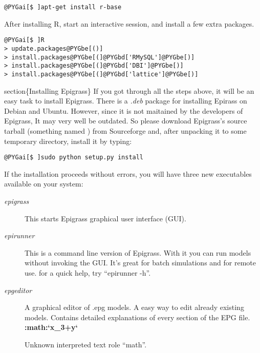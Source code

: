 \documentclass[a4paper,10pt]{manual}
\begin{document}
\begin{Verbatim}[commandchars=@\[\]]
@PYGai[$ ]apt-get install r-base
\end{Verbatim}

After installing R, start an interactive session, and install a few extra packages.

\begin{Verbatim}[commandchars=@\[\]]
@PYGai[$ ]R
> update.packages@PYGbe[()]
> install.packages@PYGbe[(]@PYGbd['RMySQL']@PYGbe[)]
> install.packages@PYGbe[(]@PYGbd['DBI']@PYGbe[)]
> install.packages@PYGbe[(]@PYGbd['lattice']@PYGbe[)]
\end{Verbatim}

section\{Installing Epigrass\}
If you got through all the steps above, it will be an easy task to install Epigrass. There is a \emph{.deb} package for installing Epirass on Debian and Ubuntu. However, since it is not maitained by the developers of Epigrass, It may very well be outdated.  So please download Epigrass's source tarball (something named ) from Sourceforge and, after unpacking it to some temporary directory, install it by typing:

\begin{Verbatim}[commandchars=@\[\]]
@PYGai[$ ]sudo python setup.py install
\end{Verbatim}

If the installation proceeds without errors, you will have three new executables available on your system:
\begin{description}
\item[\emph{epigrass}]
This starts Epigrass graphical user interface (GUI).

\item[\emph{epirunner}]
This is a command line version of Epigrass. With it you can run models without invoking the GUI. It's great for batch simulations and for remote use. for a quick help, try ``epirunner -h''.

\item[\emph{epgeditor}]
A graphical editor of .epg models. A easy way to edit already existing models. Contains detailed explanations of every section of the EPG file. {\color{red}\bfseries{}:math:`x\_3+y`}

Unknown interpreted text role ``math''.


\end{description}

\resetcurrentobjects

\resetcurrentobjects
\end{document}
